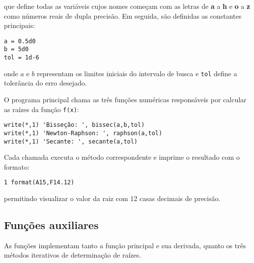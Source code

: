 \noindent
que define todas as variáveis cujos nomes começam com as letras 
de \textbf{a} a \textbf{h} e \textbf{o} a \textbf{z} como números reais 
de dupla precisão. Em seguida, são definidas as constantes principais:

\vspace*{1\baselineskip}
\begin{lstlisting}
a = 0.5d0
b = 5d0
tol = 1d-6
\end{lstlisting}

\noindent
onde $a$ e $b$ representam os limites iniciais do intervalo de busca e 
\texttt{tol} define a tolerância do erro desejado.

\bigskip
O programa principal chama as três funções numéricas responsáveis por 
calcular as raízes da função \texttt{f(x)}:

\vspace*{1\baselineskip}
\begin{lstlisting}
write(*,1) 'Bisseção: ', bissec(a,b,tol)
write(*,1) 'Newton-Raphson: ', raphson(a,tol)
write(*,1) 'Secante: ', secante(a,tol)
\end{lstlisting}

\noindent
Cada chamada executa o método correspondente e imprime o resultado com o formato:

\vspace*{1\baselineskip}
\begin{lstlisting}
1 format(A15,F14.12)
\end{lstlisting}

\noindent
permitindo visualizar o valor da raiz com 12 casas decimais de precisão.

\subsection*{Funções auxiliares}

As funções implementam tanto a função principal e sua derivada, 
quanto os três métodos iterativos de determinação de raízes.


